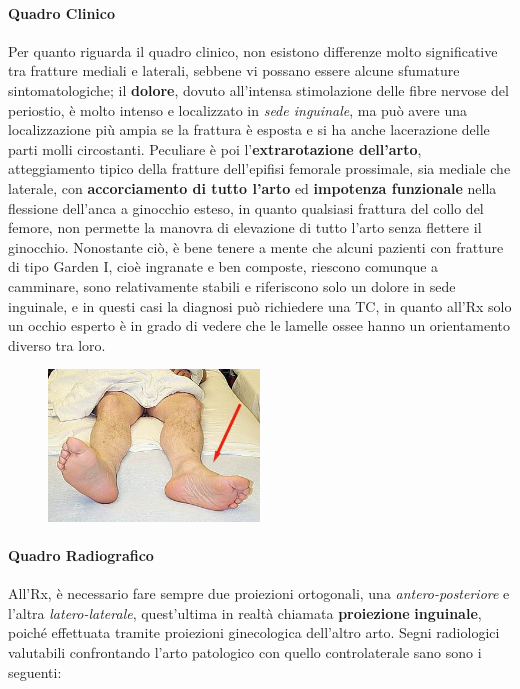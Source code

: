 \paragraph{Quadro Clinico}

Per quanto riguarda il quadro clinico, non esistono differenze molto
significative tra fratture mediali e laterali, sebbene vi possano essere
alcune sfumature sintomatologiche; il \textbf{dolore}, dovuto
all'intensa stimolazione delle fibre nervose del periostio, è molto
intenso e localizzato in \emph{sede inguinale}, ma può avere una
localizzazione più ampia se la frattura è esposta e si ha anche
lacerazione delle parti molli circostanti. Peculiare è poi
l'\textbf{extrarotazione dell'arto}, atteggiamento tipico della fratture
dell'epifisi femorale prossimale, sia mediale che laterale, con
\textbf{accorciamento di tutto l'arto} ed \textbf{impotenza funzionale}
nella flessione dell'anca a ginocchio esteso, in quanto qualsiasi
frattura del collo del femore, non permette la manovra di elevazione di
tutto l'arto senza flettere il ginocchio. Nonostante ciò, è bene tenere
a mente che alcuni pazienti con fratture di tipo Garden I, cioè
ingranate e ben composte, riescono comunque a camminare, sono
relativamente stabili e riferiscono solo un dolore in sede inguinale, e
in questi casi la diagnosi può richiedere una TC, in quanto all'Rx solo
un occhio esperto è in grado di vedere che le lamelle ossee hanno un
orientamento diverso tra loro.
\begin{figure}[!ht]
\centering
	\includegraphics[width=0.5\textwidth]{007/image9.jpeg}
\end{figure}


\paragraph{Quadro Radiografico}

All'Rx, è necessario fare sempre due proiezioni ortogonali, una
\emph{antero-posteriore} e l'altra \emph{latero-laterale}, quest'ultima
in realtà chiamata \textbf{proiezione} \textbf{inguinale}, poiché
effettuata tramite proiezioni ginecologica dell'altro arto. Segni
radiologici valutabili confrontando l'arto patologico con quello
controlaterale sano sono i seguenti:

